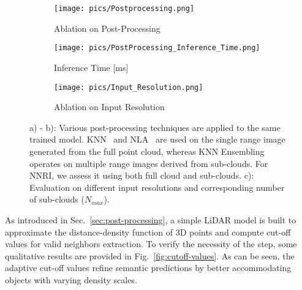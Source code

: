 \begin{figure*}[!ht]
\vspace{-2mm}
\centering
\begin{subfigure}{.32\linewidth}
    \texttt{[image: pics/Postprocessing.png]} 
    \caption{Ablation on Post-Processing}
    \label{fig:post_processing_eval}
\end{subfigure}
\begin{subfigure}{.32\linewidth}
    \texttt{[image: pics/PostProcessing\_Inference\_Time.png]} 
    \caption{Inference Time [ms]}
    \label{fig:inference_time}
\end{subfigure}
\begin{subfigure}{.32\linewidth}
    \texttt{[image: pics/Input\_Resolution.png]} 
    \caption{Ablation on Input Resolution}
    \label{fig:input_resolution}
\end{subfigure}
\caption{a) - b): Various post-processing techniques are applied to the same trained model. KNN~\cite{2019rangenet++} and NLA~\cite{zhao2021fidnet} are used on the single range image generated from the full point cloud, whereas KNN Ensembling operates on multiple range images derived from sub-clouds. For NNRI, we assess it using both full cloud and sub-clouds. c): Evaluation on different input resolutions and corresponding number of sub-clouds ($N_{max}$).}
\vspace{-5mm}
\label{fig:ablation_postprocessing}
\end{figure*}
As introduced in Sec.~\ref{sec:post-processing}, a simple LiDAR model is built to approximate the distance-density function of 3D points and compute cut-off values for valid neighbors extraction. To verify the necessity of the step, some qualitative results are provided in Fig.~\ref{fig:cutoff-values}. As can be seen, the adaptive cut-off values refine semantic predictions by better accommodating objects with varying density scales. 
